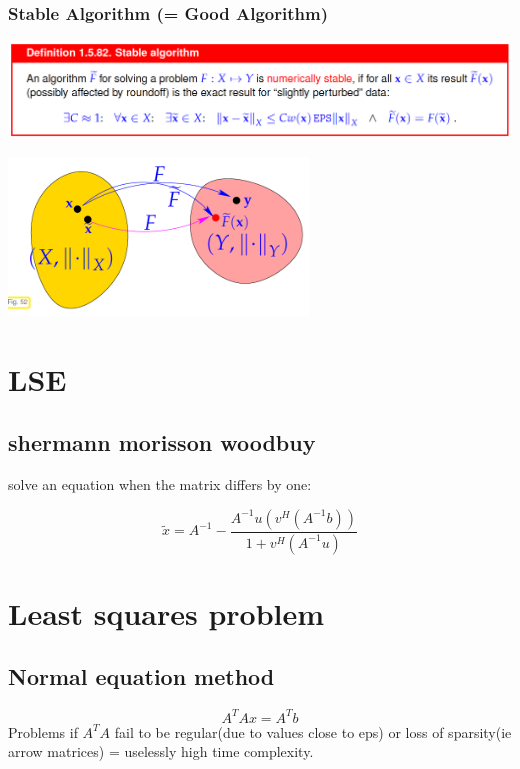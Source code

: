 \documentclass[12pt, a4paper]{article}
\begin{document}
\subsubsection{Stable Algorithm (= Good Algorithm)}
\begin{center}
	 \includegraphics[width=1.0\textwidth]{stable_algorithm1.png}
\end{center}

\begin{center}
	 \includegraphics[width=0.6\textwidth]{stable_algorithm2.png}
\end{center}
\section{LSE}
\subsection{shermann morisson woodbuy}
solve an equation when the matrix differs by one:

\begin{equation}
	\tilde{x} = A^{-1}-\frac{A^{-1}u(v^H(A^{-1}b))}{1+v^H(A^{-1}u)}
\end{equation}

\section{Least squares problem}
\subsection{Normal equation method}
\begin{equation}
	A^TAx=A^Tb
\end{equation}
Problems if $A^TA$ fail to be regular(due to values close to eps) or loss of sparsity(ie arrow matrices) = uselessly high time complexity.
\end{document}
